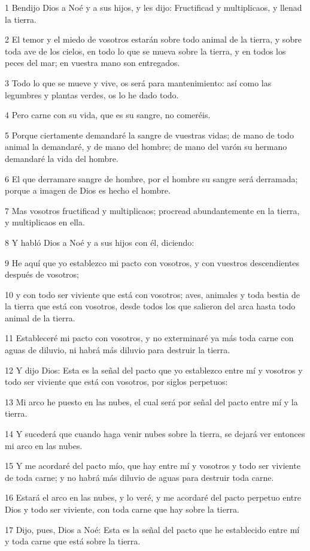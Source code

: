 \par 1 Bendijo Dios a Noé y a sus hijos, y les dijo: Fructificad y multiplicaos, y llenad la tierra.
\par 2 El temor y el miedo de vosotros estarán sobre todo animal de la tierra, y sobre toda ave de los cielos, en todo lo que se mueva sobre la tierra, y en todos los peces del mar; en vuestra mano son entregados.
\par 3 Todo lo que se mueve y vive, os será para mantenimiento: así como las legumbres y plantas verdes, os lo he dado todo.
\par 4 Pero carne con su vida, que es su sangre, no comeréis.
\par 5 Porque ciertamente demandaré la sangre de vuestras vidas; de mano de todo animal la demandaré, y de mano del hombre; de mano del varón su hermano demandaré la vida del hombre.
\par 6 El que derramare sangre de hombre, por el hombre su sangre será derramada; porque a imagen de Dios es hecho el hombre.
\par 7 Mas vosotros fructificad y multiplicaos; procread abundantemente en la tierra, y multiplicaos en ella.
\par 8 Y habló Dios a Noé y a sus hijos con él, diciendo:
\par 9 He aquí que yo establezco mi pacto con vosotros, y con vuestros descendientes después de vosotros;
\par 10 y con todo ser viviente que está con vosotros; aves, animales y toda bestia de la tierra que está con vosotros, desde todos los que salieron del arca hasta todo animal de la tierra.
\par 11 Estableceré mi pacto con vosotros, y no exterminaré ya más toda carne con aguas de diluvio, ni habrá más diluvio para destruir la tierra.
\par 12 Y dijo Dios: Esta es la señal del pacto que yo establezco entre mí y vosotros y todo ser viviente que está con vosotros, por siglos perpetuos:
\par 13 Mi arco he puesto en las nubes, el cual será por señal del pacto entre mí y la tierra.
\par 14 Y sucederá que cuando haga venir nubes sobre la tierra, se dejará ver entonces mi arco en las nubes.
\par 15 Y me acordaré del pacto mío, que hay entre mí y vosotros y todo ser viviente de toda carne; y no habrá más diluvio de aguas para destruir toda carne.
\par 16 Estará el arco en las nubes, y lo veré, y me acordaré del pacto perpetuo entre Dios y todo ser viviente, con toda carne que hay sobre la tierra.
\par 17 Dijo, pues, Dios a Noé: Esta es la señal del pacto que he establecido entre mí y toda carne que está sobre la tierra.

